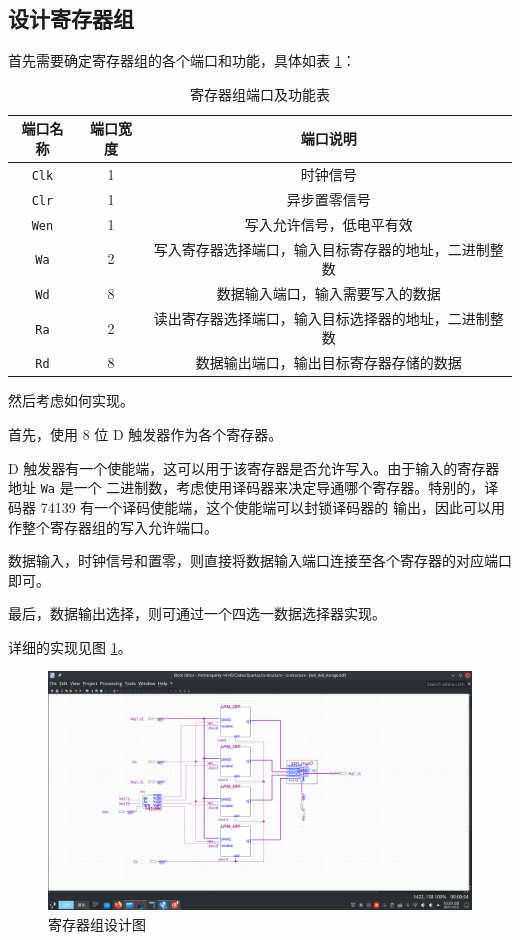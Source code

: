 \subsection{设计寄存器组}

首先需要确定寄存器组的各个端口和功能，具体如表 \ref{table:1.1-func}：

\begin{table}[h]
    \centering
    \caption{寄存器组端口及功能表}
    \label{table:1.1-func}
    \begin{tabular}{|c|c|c|}
        \hline
        端口名称 & 端口宽度 & 端口说明 \\ \hline
        \verb|Clk| & 1 & 时钟信号 \\ \hline
        \verb|Clr| & 1 & 异步置零信号 \\ \hline
        \verb|Wen| & 1 & 写入允许信号，低电平有效 \\ \hline
        \verb|Wa| & 2 & 写入寄存器选择端口，输入目标寄存器的地址，二进制整数 \\ \hline
        \verb|Wd| & 8 & 数据输入端口，输入需要写入的数据 \\ \hline
        \verb|Ra| & 2 & 读出寄存器选择端口，输入目标选择器的地址，二进制整数 \\ \hline
        \verb|Rd| & 8 & 数据输出端口，输出目标寄存器存储的数据 \\ \hline
    \end{tabular}
\end{table}

然后考虑如何实现。

首先，使用 8 位 D 触发器作为各个寄存器。

D 触发器有一个使能端，这可以用于该寄存器是否允许写入。由于输入的寄存器地址 \verb|Wa| 是一个
二进制数，考虑使用译码器来决定导通哪个寄存器。特别的，译码器 74139 有一个译码使能端，这个使能端可以封锁译码器的
输出，因此可以用作整个寄存器组的写入允许端口。

数据输入，时钟信号和置零，则直接将数据输入端口连接至各个寄存器的对应端口即可。

最后，数据输出选择，则可通过一个四选一数据选择器实现。

详细的实现见图 \ref{figure:1.2-design}。

\begin{figure}[h]
    \centering
    \caption{寄存器组设计图}
    \label{figure:1.2-design}
    \includegraphics[scale=0.2]{pics/1.2-design.png}
\end{figure}

